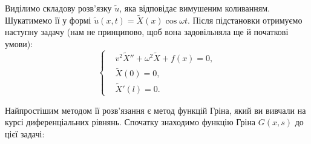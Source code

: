 Виділимо складову розв'язку $\tilde{u}$, яка відповідає вимушеним коливанням. Шукатимемо її у формі $\tilde{u}(x,t) = \widetilde{X}(x) \cos\omega t$. Після підстановки отримуємо наступну задачу (нам не принципово, щоб вона задовільняла ще й початкові умови):
\begin{equation} \label{probcond8}
    \left\{ \begin{aligned} %
        &v^2\widetilde{X}'' + \omega^2\widetilde{X} + f(x) = 0,\\
        &\widetilde{X}(0)=0,\\
        &\widetilde{X}'(l)=0.
    \end{aligned} \right.
\end{equation}

Найпростішим методом її розв'язання є метод функцій Гріна, який ви вивчали на курсі диференціальних рівнянь. Спочатку знаходимо функцію Гріна $G(x,s)$ до цієї задачі:

